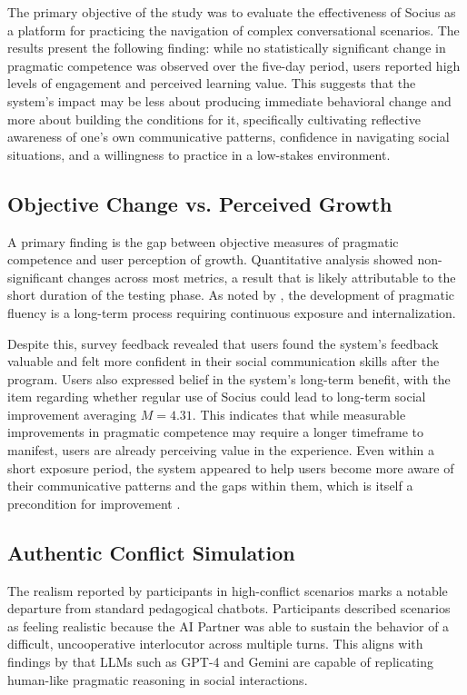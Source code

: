 \indent The primary objective of the study was to evaluate the 
effectiveness of Socius as a platform for practicing the navigation of 
complex conversational scenarios. The results present the following 
finding: while no statistically significant change in pragmatic competence 
was observed over the five-day period, users reported high levels of 
engagement and perceived learning value. This suggests that the system's 
impact may be less about producing immediate behavioral change and more 
about building the conditions for it, specifically cultivating reflective 
awareness of one's own communicative patterns, confidence in navigating 
social situations, and a willingness to practice in a low-stakes environment.

\subsection{Objective Change vs. Perceived Growth}
\indent A primary finding is the gap between objective measures of 
pragmatic competence and user perception of growth. Quantitative analysis 
showed non-significant changes across most metrics, a result that is likely 
attributable to the short duration of the testing phase. As noted by 
, the development of pragmatic fluency is a long-term 
process requiring continuous exposure and internalization.

\indent Despite this, survey feedback revealed that users found the 
system's feedback valuable and felt more confident in their social 
communication skills after the program. Users also expressed belief in the 
system's long-term benefit, with the item regarding whether regular use of 
Socius could lead to long-term social improvement averaging $M = 4.31$. 
This indicates that while measurable improvements in pragmatic competence 
may require a longer timeframe to manifest, users are already perceiving 
value in the experience. Even within a short exposure period, the system 
appeared to help users become more aware of their communicative patterns 
and the gaps within them, which is itself a precondition for improvement 
\cite{kasper1996}.

\subsection{Authentic Conflict Simulation}
\indent The realism reported by participants in high-conflict scenarios 
marks a notable departure from standard pedagogical chatbots. Participants 
described scenarios as feeling realistic because the AI Partner was able to 
sustain the behavior of a difficult, uncooperative interlocutor across 
multiple turns. This aligns with findings by  
that LLMs such as GPT-4 and Gemini are capable of replicating human-like 
pragmatic reasoning in social interactions.

